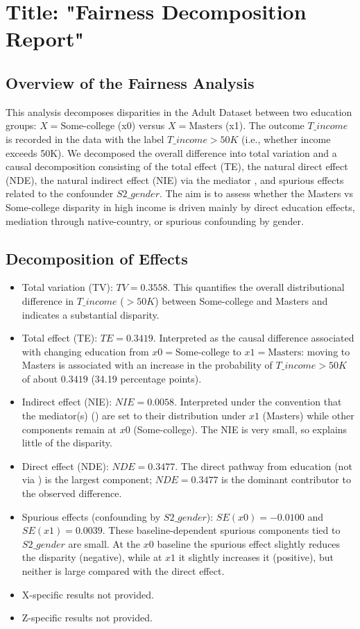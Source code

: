 \documentclass{article}
\begin{document}
\section*{Title: "Fairness Decomposition Report"}

\subsection*{Overview of the Fairness Analysis}
This analysis decomposes disparities in the Adult Dataset between two education groups: $X = \text{Some-college}$ (x0) versus $X = \text{Masters}$ (x1). The outcome $T\_income$ is recorded in the data with the label $T\_income > 50K$ (i.e., whether income exceeds 50K). We decomposed the overall difference into total variation and a causal decomposition consisting of the total effect (TE), the natural direct effect (NDE), the natural indirect effect (NIE) via the mediator , and spurious effects related to the confounder $S2\_gender$. The aim is to assess whether the Masters vs Some-college disparity in high income is driven mainly by direct education effects, mediation through native-country, or spurious confounding by gender.

\subsection*{Decomposition of Effects}
\begin{itemize}
  \item Total variation (TV): $TV = 0.3558$. This quantifies the overall distributional difference in $T\_income$ ($>50K$) between Some-college and Masters and indicates a substantial disparity.
  \item Total effect (TE): $TE = 0.3419$. Interpreted as the causal difference associated with changing education from $x0 = \text{Some-college}$ to $x1 = \text{Masters}$: moving to Masters is associated with an increase in the probability of $T\_income > 50K$ of about $0.3419$ (34.19 percentage points).
  \item Indirect effect (NIE): $NIE = 0.0058$. Interpreted under the convention that the mediator(s) () are set to their distribution under $x1$ (Masters) while other components remain at $x0$ (Some-college). The NIE is very small, so  explains little of the disparity.
  \item Direct effect (NDE): $NDE = 0.3477$. The direct pathway from education (not via ) is the largest component; $NDE = 0.3477$ is the dominant contributor to the observed difference.
  \item Spurious effects (confounding by $S2\_gender$): $SE(x0) = -0.0100$ and $SE(x1) = 0.0039$. These baseline-dependent spurious components tied to $S2\_gender$ are small. At the $x0$ baseline the spurious effect slightly reduces the disparity (negative), while at $x1$ it slightly increases it (positive), but neither is large compared with the direct effect.
  \item X-specific results not provided.
  \item Z-specific results not provided.
\end{itemize}
\end{document}
